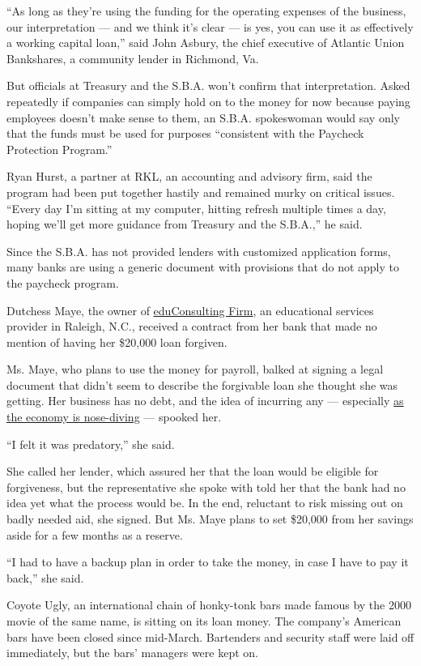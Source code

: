 ``As long as they're using the funding for the operating expenses of the
business, our interpretation --- and we think it's clear --- is yes, you
can use it as effectively a working capital loan,'' said John Asbury,
the chief executive of Atlantic Union Bankshares, a community lender in
Richmond, Va.

But officials at Treasury and the S.B.A. won't confirm that
interpretation. Asked repeatedly if companies can simply hold on to the
money for now because paying employees doesn't make sense to them, an
S.B.A. spokeswoman would say only that the funds must be used for
purposes ``consistent with the Paycheck Protection Program.''

Ryan Hurst, a partner at RKL, an accounting and advisory firm, said the
program had been put together hastily and remained murky on critical
issues. ``Every day I'm sitting at my computer, hitting refresh multiple
times a day, hoping we'll get more guidance from Treasury and the
S.B.A.,'' he said.

Since the S.B.A. has not provided lenders with customized application
forms, many banks are using a generic document with provisions that do
not apply to the paycheck program.

Dutchess Maye, the owner of
\href{https://www.educonsultingfirm.com/}{eduConsulting Firm}, an
educational services provider in Raleigh, N.C., received a contract from
her bank that made no mention of having her \$20,000 loan forgiven.

Ms. Maye, who plans to use the money for payroll, balked at signing a
legal document that didn't seem to describe the forgivable loan she
thought she was getting. Her business has no debt, and the idea of
incurring any --- especially
\href{https://www.nytimes.com/2020/04/29/business/economy/us-gdp.html}{as
the economy is nose-diving} --- spooked her.

``I felt it was predatory,'' she said.

She called her lender, which assured her that the loan would be eligible
for forgiveness, but the representative she spoke with told her that the
bank had no idea yet what the process would be. In the end, reluctant to
risk missing out on badly needed aid, she signed. But Ms. Maye plans to
set \$20,000 from her savings aside for a few months as a reserve.

``I had to have a backup plan in order to take the money, in case I have
to pay it back,'' she said.

Coyote Ugly, an international chain of honky-tonk bars made famous by
the 2000 movie of the same name, is sitting on its loan money. The
company's American bars have been closed since mid-March. Bartenders and
security staff were laid off immediately, but the bars' managers were
kept on.

